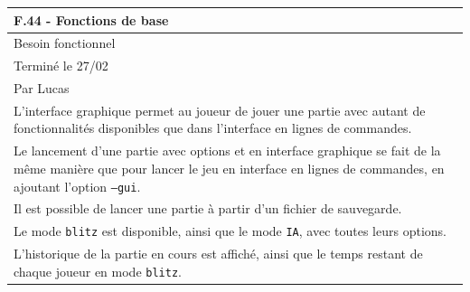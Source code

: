 \documentclass[a4paper,12pt]{article}
\begin{document}
\vspace{1cm}

\noindent
\setlength{\arrayrulewidth}{1.5pt}
\renewcommand{\arraystretch}{1.5}
\begin{tabularx}{\textwidth}{|X|}
    \hline
    \textbf{F.44 - Fonctions de base}                                                                                                                                                                                                  \\
    \hline
    Besoin fonctionnel                                                                                                                                                                                                                 \\
    \hline
    Terminé le 27/02                                                                                                                                                                                                                   \\
    Par Lucas                                                                                                                                                                                                                          \\
    \hline
    L’interface graphique permet au joueur de jouer une partie avec autant de fonctionnalités disponibles que dans l’interface en lignes de commandes.                                                                                 \\
    Le lancement d’une partie avec options et en interface graphique se fait de la même manière que pour lancer le jeu en interface en lignes de commandes, en ajoutant l’option \texttt{--gui}.                                       \\
    Il est possible de lancer une partie à partir d’un fichier de sauvegarde.                                                                                                                                                          \\
    Le mode \texttt{blitz} est disponible, ainsi que le mode \texttt{IA}, avec toutes leurs options.                                                                                                                                   \\
    L’historique de la partie en cours est affiché, ainsi que le temps restant de chaque joueur en mode \texttt{blitz}.                                                                                                                \\

\end{tabularx}
\end{document}
